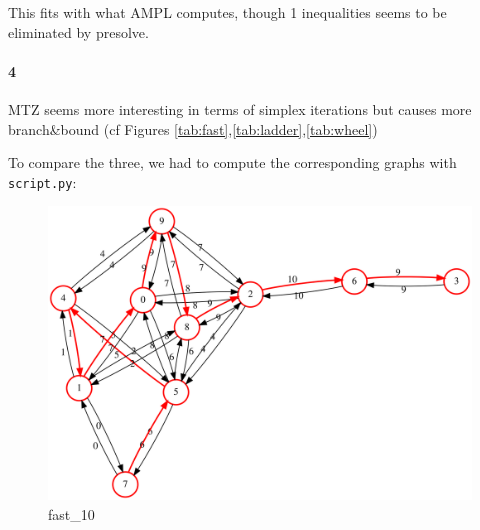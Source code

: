 \documentclass{article}
\begin{document}
This fits with what AMPL computes, though 1 inequalities seems to be eliminated by presolve.

\paragraph{4}
MTZ seems more interesting in terms of simplex iterations but causes more
branch\&bound (cf Figures \ref{tab:fast},\ref{tab:ladder},\ref{tab:wheel})

To compare the three, we had to compute the corresponding graphs with \texttt{script.py}:

\begin{figure}[H]
  \centering
  \includegraphics[scale=0.3]{graph/GST_fast_10}
  \caption{fast\_10}
\end{figure}
\end{document}
